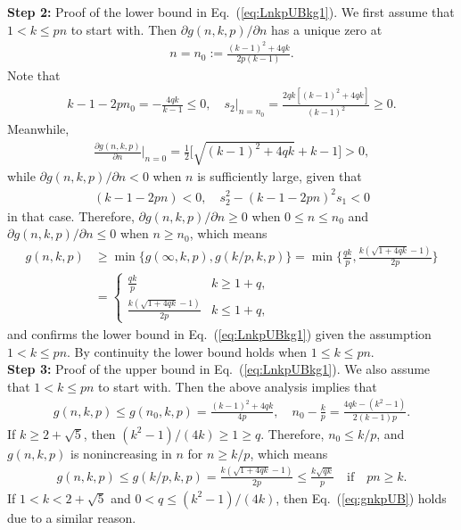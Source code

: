 \documentclass[aop]{imsart}
\theoremstyle{plain}
\theoremstyle{remark}
\newcommand{\1}{\operatorname{\uppercase\expandafter{\romannumeral1}}}
\newcommand{\2}{\operatorname{\uppercase\expandafter{\romannumeral2}}}
\newcommand{\3}{\operatorname{\uppercase\expandafter{\romannumeral3}}}
\newcommand{\4}{\operatorname{\uppercase\expandafter{\romannumeral4}}}
\newcommand{\5}{\operatorname{\uppercase\expandafter{\romannumeral5}}}
\newcommand{\6}{\operatorname{\uppercase\expandafter{\romannumeral6}}}
\newcommand{\7}{\operatorname{\uppercase\expandafter{\romannumeral7}}}
\newcommand{\8}{\operatorname{\uppercase\expandafter{\romannumeral8}}}
\newcommand{\9}{\operatorname{\uppercase\expandafter{\romannumeral9}}}
\newcommand{\eref}[1]{Eq.~\textup{(\ref{#1})}}
\begin{document}
\begin{appendix}
\textbf{Step 2:} Proof of the lower bound in \eref{eq:LnkpUBkg1}. We first  assume that $1<k\leq p n$ to start with.
Then   $\partial g(n,k,p)/\partial n$ has a unique zero at \begin{align}
	n=n_0:=\frac{(k-1)^2+4q k}{2p(k-1)}. 
	\end{align}
	Note that 
	\begin{align}
	k-1-2p n_0=-\frac{4q k}{k-1}\leq 0,\quad s_2|_{n= n_0}=\frac{2q k[(k-1)^2+4q k]}{(k-1)^2}\geq 0. 
	\end{align}
	Meanwhile, 
	\begin{align}
	\frac{\partial g(n,k,p)}{\partial n}\bigg|_{n=0}=\frac{1}{2}\bigl[\sqrt{(k-1)^2+4q k}+k-1\bigr]>0,
	\end{align}
	while $\partial g(n,k,p)/\partial n<0$  when $n$ is sufficiently large, given that
\begin{align}
(k-1-2p n)<0,\quad s_2^2-(k-1-2p n)^2 s_1<0
\end{align}	
in that case. 	Therefore,  $\partial g(n,k,p)/\partial n\geq 0$ when $0\leq n\leq n_0$ and  $\partial g(n,k,p)/\partial n\leq  0$ when $n\geq n_0$, which means 
	\begin{align}
	g(n,k,p)&\geq{\min}\{g(\infty,k,p),g(k/p,k,p)\}={\min}\biggl\{\frac{q k}{p },\frac{k(\sqrt{1+4q k}-1)}{2p } \biggr\}\\
	&=\begin{cases}
	\frac{q k}{p } &k \geq 1+q, \\[1ex]
	\frac{k(\sqrt{1+4q k}-1)}{2p } &k \leq 1+q,
	\end{cases} \nonumber
	\end{align}
	and confirms the lower bound in \eref{eq:LnkpUBkg1} given the assumption $1<k\leq pn$.  By continuity the lower bound holds  when $1\leq k\leq pn$. \\
	
	
\textbf{Step 3:} Proof of the upper bound in \eref{eq:LnkpUBkg1}.  We also  assume that $1<k\leq p n$ to start with.	Then the above analysis implies that 
	\begin{gather}
	g(n,k,p)\leq g(n_0,k,p)=\frac{(k-1)^2+4q k}{4p},\quad 
	n_0-\frac{k}{p}=\frac{4q k -(k^2-1)}{2(k-1)p}.
	\end{gather}
	If $k\geq 2+\sqrt{5}$, then $(k^2-1)/(4k)\geq 1\geq q$. Therefore, $n_0\leq k/p$, and $g(n,k,p)$ is nonincreasing in $n$ for $n\geq k/p$, which means 
	\begin{align}\label{eq:gnkpUB}
	g(n,k,p)\leq g(k/p,k,p)=\frac{k(\sqrt{1+4q k}-1)}{2p}\leq \frac{k\sqrt{q k}}{p}\quad \mbox{if}\quad  p n\geq k. 
	\end{align}
	If $1<k< 2+\sqrt{5}$ and  $0<q \leq (k^2-1)/(4k)$, then \eref{eq:gnkpUB} holds due to a similar reason. 
	

\end{appendix}
\end{document}
